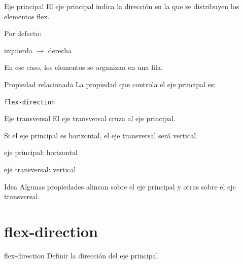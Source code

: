 \documentclass[aspectratio=169,11.5pt]{beamer}
\begin{document}
    \begin{frame}{Eje principal}
        El eje principal indica la dirección en la que
        se distribuyen los elementos flex.

        Por defecto:

        \begin{center}
            \Large
            izquierda $\rightarrow$ derecha
        \end{center}

        En ese caso, los elementos se organizan en una fila.

        \begin{block}{Propiedad relacionada}
            La propiedad que controla el eje principal es:

            \texttt{flex-direction}
        \end{block}
    \end{frame}

    \begin{frame}{Eje transversal}
        El eje transversal cruza al eje principal.

        Si el eje principal es horizontal,
        el eje transversal será vertical.

        \begin{center}
            \Large
            eje principal: horizontal

            \vspace{0.3cm}

            eje transversal: vertical
        \end{center}

        \begin{block}{Idea}
            Algunas propiedades alinean sobre el eje principal
            y otras sobre el eje transversal.
        \end{block}
    \end{frame}


    \section{flex-direction}

    \SectionSlide
    {flex-direction}
    {Definir la dirección del eje principal}
\end{document}

